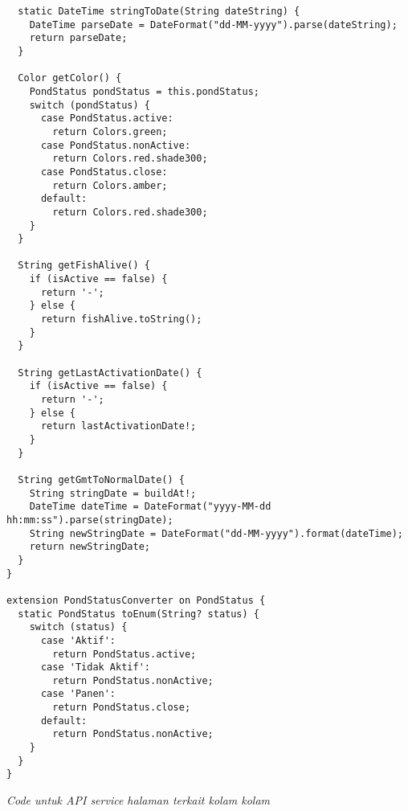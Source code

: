 \begin{lstlisting}
  static DateTime stringToDate(String dateString) {
    DateTime parseDate = DateFormat("dd-MM-yyyy").parse(dateString);
    return parseDate;
  }

  Color getColor() {
    PondStatus pondStatus = this.pondStatus;
    switch (pondStatus) {
      case PondStatus.active:
        return Colors.green;
      case PondStatus.nonActive:
        return Colors.red.shade300;
      case PondStatus.close:
        return Colors.amber;
      default:
        return Colors.red.shade300;
    }
  }

  String getFishAlive() {
    if (isActive == false) {
      return '-';
    } else {
      return fishAlive.toString();
    }
  }

  String getLastActivationDate() {
    if (isActive == false) {
      return '-';
    } else {
      return lastActivationDate!;
    }
  }

  String getGmtToNormalDate() {
    String stringDate = buildAt!;
    DateTime dateTime = DateFormat("yyyy-MM-dd hh:mm:ss").parse(stringDate);
    String newStringDate = DateFormat("dd-MM-yyyy").format(dateTime);
    return newStringDate;
  }
}

extension PondStatusConverter on PondStatus {
  static PondStatus toEnum(String? status) {
    switch (status) {
      case 'Aktif':
        return PondStatus.active;
      case 'Tidak Aktif':
        return PondStatus.nonActive;
      case 'Panen':
        return PondStatus.close;
      default:
        return PondStatus.nonActive;
    }
  }
}
	\end{lstlisting}

	\textit{Code untuk API service halaman terkait kolam kolam}
	
